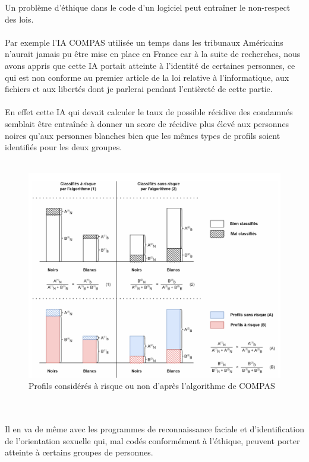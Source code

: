 \documentclass{article}
\begin{document}
Un problème d'éthique dans le code d'un logiciel peut entraîner le non-respect des lois.\\
\\Par exemple l'IA COMPAS utilisée un temps dans les tribunaux Américains n'aurait jamais pu être mise en place en France car à la suite de recherches, nous avons appris que cette IA portait atteinte à l'identité de certaines personnes, ce qui est non conforme au premier article de la loi relative à l'informatique, aux fichiers et aux libertés dont je parlerai pendant l'entièreté de cette partie.\\
\\En effet cette IA qui devait calculer le taux de possible récidive des condamnés semblait être entraînée à donner un score de récidive plus élevé aux personnes noires qu’aux personnes blanches bien que les mêmes types de profils soient identifiés pour les deux groupes.\\
\\
\begin{figure}[h!]
    \centering
    \includegraphics[width=1\linewidth]{images/Graphique COMPAS.PNG}
    \caption{Profils considérés à risque ou non d'après l'algorithme de COMPAS\cite{noauthor_compas_nodate}}
    \label{COMPAS graph}
\end{figure}
\\
\\Il en va de même avec les programmes de reconnaissance faciale et d'identification de l'orientation sexuelle qui, mal codés conformément à l'éthique, peuvent porter atteinte à certains groupes de personnes.\\
\end{document}
